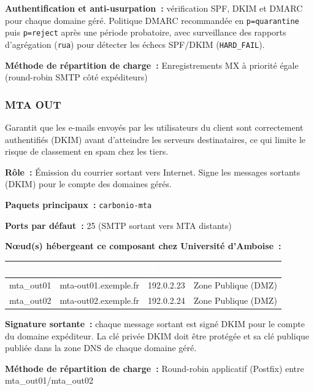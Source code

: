 \documentclass[11pt,a4paper]{report}
\newcommand{\tblhead}[1]{\textcolor{white}{\textbf{#1}}}
\begin{document}
\textbf{Authentification et anti-usurpation~:} vérification SPF, DKIM et DMARC pour chaque domaine géré. Politique DMARC recommandée en \texttt{p=quarantine} puis \texttt{p=reject} après une période probatoire, avec surveillance des rapports d'agrégation (\texttt{rua}) pour détecter les échecs SPF/DKIM (\texttt{HARD\_FAIL}).

\textbf{Méthode de répartition de charge~:} Enregistrements MX à priorité égale (round-\allowbreak{}robin SMTP côté expéditeurs)


\subsubsection{MTA OUT}

Garantit que les e-\allowbreak{}mails envoyés par les utilisateurs du client sont correctement authentifiés (DKIM) avant d'atteindre les serveurs destinataires, ce qui limite le risque de classement en spam chez les tiers.\allowbreak{}

\textbf{Rôle~:} Émission du courrier sortant vers Internet.\allowbreak{} Signe les messages sortants (DKIM) pour le compte des domaines gérés.\allowbreak{}


\textbf{Paquets principaux~:} \texttt{carbonio-\allowbreak{}mta}

\textbf{Ports par défaut~:} 25 (SMTP sortant vers MTA distants)

\textbf{Nœud(s) hébergeant ce composant chez Université d'Amboise~:}
\begin{longtable}{|p{3.2cm}|p{4.5cm}|p{3.2cm}|p{2.3cm}|}
\hline
\rowcolor{primary}\tblhead{Nœud} & \tblhead{Hostname} & \tblhead{IP} & \tblhead{Zone} \\
\hline
\endhead
mta\_out01 & mta-\allowbreak{}out01.\allowbreak{}exemple.\allowbreak{}fr & 192.\allowbreak{}0.\allowbreak{}2.\allowbreak{}23 & Zone Publique (DMZ) \\
\hline
mta\_out02 & mta-\allowbreak{}out02.\allowbreak{}exemple.\allowbreak{}fr & 192.\allowbreak{}0.\allowbreak{}2.\allowbreak{}24 & Zone Publique (DMZ) \\
\hline
\end{longtable}

\textbf{Signature sortante~:} chaque message sortant est signé DKIM pour le compte du domaine expéditeur. La clé privée DKIM doit être protégée et sa clé publique publiée dans la zone DNS de chaque domaine géré.

\textbf{Méthode de répartition de charge~:} Round-\allowbreak{}robin applicatif (Postfix) entre mta\_out01/mta\_out02
\end{document}
